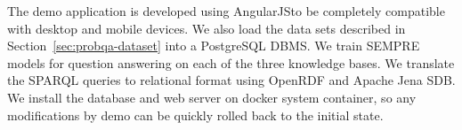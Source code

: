

The demo application is developed using AngularJS\@ to be completely compatible with desktop and mobile devices.
We also load the data sets described in Section~\ref{sec:probqa-dataset} into a PostgreSQL DBMS\@.
We train SEMPRE models for question answering on each of the three knowledge bases.
We translate the SPARQL queries to relational format using OpenRDF and Apache Jena SDB\@.
We install the database and web server on docker system container, so any modifications by demo can be quickly rolled back to the initial state.





